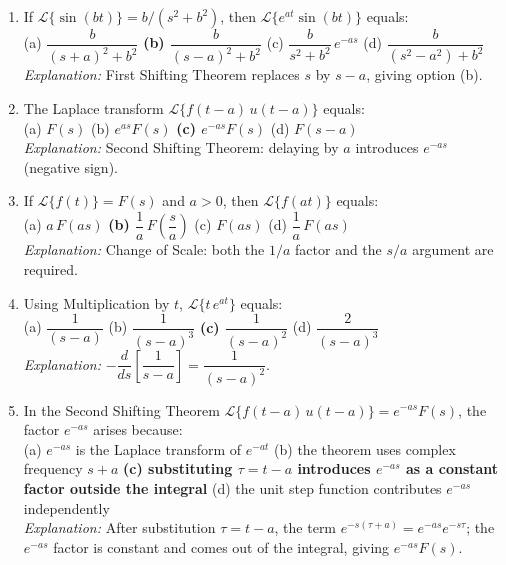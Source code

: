 \documentclass[12pt,a4paper]{article}
\begin{document}
\begin{enumerate}

\item If $\mathcal{L}\{\sin(bt)\} = b/(s^2+b^2)$, then $\mathcal{L}\{e^{at}\sin(bt)\}$ equals:\\
(a) $\dfrac{b}{(s+a)^2+b^2}$ \quad
\textbf{(b) $\dfrac{b}{(s-a)^2+b^2}$} \quad
(c) $\dfrac{b}{s^2+b^2}\,e^{-as}$ \quad
(d) $\dfrac{b}{(s^2-a^2)+b^2}$\\
\textit{Explanation:} First Shifting Theorem replaces $s$ by $s - a$, giving option (b).

\item The Laplace transform $\mathcal{L}\{f(t-a)\,u(t-a)\}$ equals:\\
(a) $F(s)$ \quad
(b) $e^{as}F(s)$ \quad
\textbf{(c) $e^{-as}F(s)$} \quad
(d) $F(s-a)$\\
\textit{Explanation:} Second Shifting Theorem: delaying by $a$ introduces $e^{-as}$ (negative sign).

\item If $\mathcal{L}\{f(t)\} = F(s)$ and $a > 0$, then $\mathcal{L}\{f(at)\}$ equals:\\
(a) $a\,F(as)$ \quad
\textbf{(b) $\dfrac{1}{a}\,F\!\left(\dfrac{s}{a}\right)$} \quad
(c) $F(as)$ \quad
(d) $\dfrac{1}{a}\,F(as)$\\
\textit{Explanation:} Change of Scale: both the $1/a$ factor and the $s/a$ argument are required.

\item Using Multiplication by $t$, $\mathcal{L}\{t\,e^{at}\}$ equals:\\
(a) $\dfrac{1}{(s-a)}$ \quad
(b) $\dfrac{1}{(s-a)^3}$ \quad
\textbf{(c) $\dfrac{1}{(s-a)^2}$} \quad
(d) $\dfrac{2}{(s-a)^3}$\\
\textit{Explanation:} $-\dfrac{d}{ds}\left[\dfrac{1}{s-a}\right] = \dfrac{1}{(s-a)^2}$.

\item In the Second Shifting Theorem $\mathcal{L}\{f(t-a)\,u(t-a)\} = e^{-as}F(s)$,
the factor $e^{-as}$ arises because:\\
(a) $e^{-as}$ is the Laplace transform of $e^{-at}$ \quad
(b) the theorem uses complex frequency $s+a$ \quad
\textbf{(c) substituting $\tau = t-a$ introduces $e^{-as}$ as a constant factor outside the integral} \quad
(d) the unit step function contributes $e^{-as}$ independently\\
\textit{Explanation:} After substitution $\tau = t-a$, the term $e^{-s(\tau+a)} = e^{-as}e^{-s\tau}$;
the $e^{-as}$ factor is constant and comes out of the integral, giving $e^{-as}F(s)$.

\end{enumerate}
\end{document}
